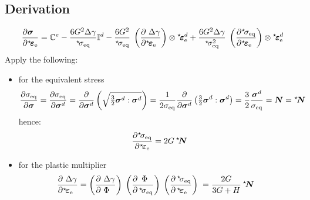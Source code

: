 \documentclass[times]{goose-article}
\newcommand\leftstar[1]{\hspace*{-.3em}~^\star\!#1}
\begin{document}
\subsection{Derivation}

\begin{align}
\frac{
  \partial \bm{\sigma} \hfill
}{
  \partial \leftstar{\bm{\varepsilon}}_\mathrm{e} \hfill
} =
\mathbb{C}^e
- \frac{6 G^2 \Delta \gamma}{\leftstar{\sigma}_\mathrm{eq}} \mathbb{I}^d
- \frac{6 G^2}{\leftstar{\sigma}_\mathrm{eq}} \;
\left( \frac{
  \partial ~\Delta \gamma \hfill
}{
  \partial \leftstar{\bm{\varepsilon}}_\mathrm{e} \hfill
} \right) \otimes
\leftstar{\bm{\varepsilon}}_\mathrm{e}^d
+ \frac{6 G^2 \Delta \gamma}{\leftstar{\sigma}_\mathrm{eq}^2} \;
\left( \frac{
  \partial \leftstar{\sigma}_\mathrm{eq} \hfill
}{
  \partial \leftstar{\bm{\varepsilon}}_\mathrm{e} \hfill
} \right) \otimes
\leftstar{\bm{\varepsilon}}_\mathrm{e}^d
\end{align}
Apply the following:
\begin{itemize}
\item for the equivalent stress
\begin{equation}
  \frac{\partial \sigma_\mathrm{eq}}{\partial \bm{\sigma}}
  = \frac{\partial \sigma_\mathrm{eq}}{\partial \bm{\sigma}^d}
  = \frac{\partial}{\partial \bm{\sigma}^d } \left( \sqrt{ \tfrac{3}{2} \bm{\sigma}^d : \bm{\sigma}^d } \right)
  = \frac{1}{2 \sigma_\mathrm{eq} } \frac{\partial}{\partial \bm{\sigma}^d} \left( \tfrac{3}{2} \bm{\sigma}^d : \bm{\sigma}^d \right)
  = \frac{3}{2} \frac{\bm{\sigma}^d}{\sigma_\mathrm{eq}} = \bm{N} = \leftstar{\bm{N}}
\end{equation}
hence:
\begin{equation}
  \frac{
    \partial \leftstar{\sigma}_\mathrm{eq}
  }{
    \partial \leftstar{\bm{\varepsilon}}_\mathrm{e}
  } =
  2 G \, \leftstar{\bm{N}}
\end{equation}
\item for the plastic multiplier
\begin{align}
  \frac{
    \partial ~\Delta \gamma \hfill
  }{
    \partial  \leftstar{\bm{\varepsilon}}_\mathrm{e}  \hfill
  }
  =
  \left( \frac{
    \partial ~\Delta \gamma \hfill
  }{
    \partial ~\Phi \hfill
  } \right) \;
  \left( \frac{
    \partial \,~\Phi \hfill
  }{
    \partial  \,\leftstar{\sigma}_\mathrm{eq} \hfill
  } \right) \;
  \left( \frac{
    \partial \,\leftstar{\sigma}_\mathrm{eq} \hfill
  }{
    \partial \,\leftstar{\bm{\varepsilon}}_\mathrm{e} \hfill
  } \right) \;
  &= \frac{2 G}{3 G + H} \, \leftstar{\bm{N}}
\end{align}
\end{itemize}
\end{document}
